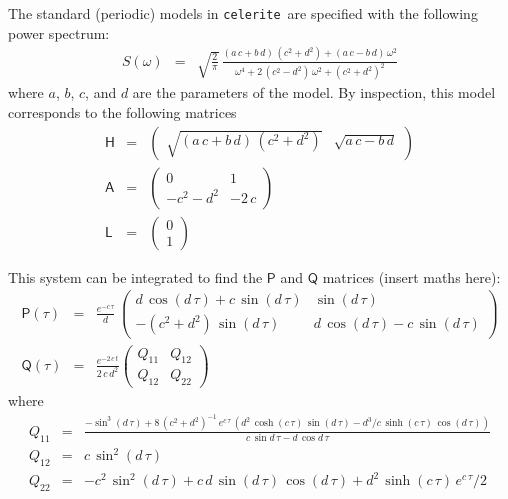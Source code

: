 \documentclass[10pt]{article}
\newcommand{\code}[1]{\texttt{#1}}
\renewcommand{\matrix}[1]{\mathsf{#1}}
\newcommand{\celerite}{\code{celerite}}
\begin{document}
The standard (periodic) models in \celerite\ are specified with the following power spectrum:
\begin{eqnarray}
  S(\omega) &=& \sqrt{\frac{2}{\pi}}\,\frac{(a\,c+b\,d)\,(c^2 + d^2) + (a\,c - b\,d)\,\omega^2}{\omega^4 + 2\,(c^2 - d^2)\,\omega^2 + (c^2 + d^2)^2}
\end{eqnarray}
where $a$, $b$, $c$, and $d$ are the parameters of the model.
By inspection, this model corresponds to the following matrices
\begin{eqnarray}
  \matrix{H} &=& \left(\begin{array}{cc}
      \sqrt{(a\,c+b\,d)\,(c^2 + d^2)} & \sqrt{a\,c - b\,d}
    \end{array}\right) \\
  \matrix{A} &=& \left(\begin{array}{cc}
      0          & 1     \\
      -c^2 - d^2 & -2\,c
    \end{array}\right) \\
  \matrix{L} &=& \left(\begin{array}{c}
      0 \\
      1
    \end{array}\right)
\end{eqnarray}

This system can be integrated to find the $\matrix{P}$ and $\matrix{Q}$ matrices (insert maths here):
\begin{eqnarray}
  \matrix{P}(\tau) &=& \frac{e^{-c\,\tau}}{d}\,\left(\begin{array}{cc}
      d\,\cos(d\,\tau) + c\,\sin(d\,\tau) & \sin(d\,\tau)                       \\
      -(c^2 + d^2)\,\sin(d\,\tau)         & d\,\cos(d\,\tau) - c\,\sin(d\,\tau)
    \end{array}\right) \nonumber\\
  \matrix{Q}(\tau) &=& \frac{e^{-2\,c\,t}}{2\,c\,d^2}\left(\begin{array}{cc}
      Q_{11} & Q_{12} \\
      Q_{12} & Q_{22}
    \end{array}\right)
\end{eqnarray}
where
\begin{eqnarray}
  Q_{11} &=& \frac{-\sin^3(d\,\tau) + 8\,(c^2+d^2)^{-1}\,e^{c\,\tau}\,\left(d^2\,\cosh(c\,\tau)\,\sin(d\,\tau) - d^3/c\,\sinh(c\,\tau)\,\cos(d\,\tau)\right)}{c\,\sin d\,\tau - d\,\cos d\,\tau} \nonumber\\
  Q_{12} &=& c\,\sin^2 (d\,\tau) \,\nonumber\\
  Q_{22} &=& -c^2\,\sin^2 (d\,\tau) + c\,d\,\sin(d\,\tau)\,\cos(d\,\tau) + d^2\,\sinh(c\,\tau)\,e^{c\,\tau}/2 \nonumber
\end{eqnarray}
\end{document}
